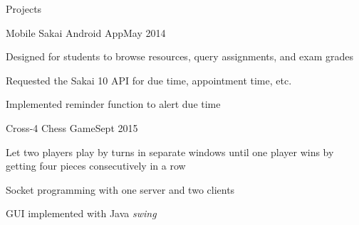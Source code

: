 \documentclass{resume} %
\begin{document}
\begin{rSection}{Projects}

	\begin{rSubsection}{Mobile Sakai Android App}{May 2014}{}{}
	\item Designed for students to browse resources, query assignments, and exam grades
	\item Requested the Sakai 10 API for due time, appointment time, etc.
	\item Implemented reminder function to alert due time
	\end{rSubsection}
	
	
	\begin{rSubsection}{Cross-4 Chess Game}{Sept 2015}{}{}
		\item Let two players play by turns in separate windows until one player wins by getting four pieces consecutively in a row 
		\item Socket programming with one server and two clients
		\item GUI implemented with Java \textit{swing}		
	\end{rSubsection}

\end{rSection}
\end{document}
